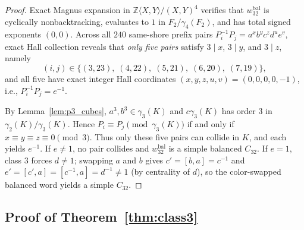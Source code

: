 \documentclass[11pt]{amsart}
\theoremstyle{definition}
\theoremstyle{remark}
\newcommand{\Z}{\mathbb{Z}}
\begin{document}
\begin{proof}
Exact Magnus expansion in $\Z\langle X,Y\rangle/(X,Y)^4$ verifies that $w_{32}^{\mathrm{bal}}$ is cyclically nonbacktracking, evaluates to $1$ in $F_2/\gamma_4(F_2)$, and has total signed exponents $(0,0)$. Across all $240$ same-shore prefix pairs $P_i^{-1} P_j = a^x b^y c^z d^u e^v$, exact Hall collection reveals that \emph{only five pairs} satisfy $3 \mid x$, $3 \mid y$, and $3 \mid z$, namely
\[
(i,j) \in \{(3,23),\; (4,22),\; (5,21),\; (6,20),\; (7,19)\},
\]
and all five have exact integer Hall coordinates $(x,y,z,u,v) = (0,0,0,0,-1)$, i.e., $P_i^{-1} P_j = e^{-1}$.

By Lemma~\ref{lem:p3_cubes}, $a^3, b^3 \in \gamma_3(K)$ and $c \gamma_3(K)$ has order $3$ in $\gamma_2(K)/\gamma_3(K)$. Hence $P_i \equiv P_j \pmod{\gamma_3(K)}$ if and only if $x \equiv y \equiv z \equiv 0 \pmod 3$. Thus only these five pairs can collide in $K$, and each yields $e^{-1}$. If $e \ne 1$, no pair collides and $w_{32}^{\mathrm{bal}}$ is a simple balanced $C_{32}$. If $e = 1$, class $3$ forces $d \ne 1$; swapping $a$ and $b$ gives $c' = [b,a] = c^{-1}$ and $e' = [c', a] = [c^{-1}, a] = d^{-1} \ne 1$ (by centrality of $d$), so the color-swapped balanced word yields a simple $C_{32}$.
\end{proof}

\subsection{Proof of Theorem~\ref{thm:class3}}
\end{document}
